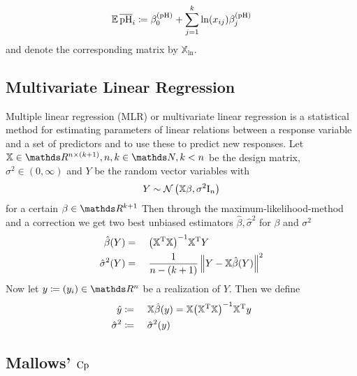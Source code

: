 		\[
			\operatorname{\mathbb{E}} \mathrm{\overline{pH}}_i \coloneqq \beta^{\mathrm{\mathrm{(pH)}}}_0 + \sum_{j = 1}^k{\ln (x_{ij}) \beta^{\mathrm{(pH)}}_j} 
		\]
		and denote the corresponding matrix by $\mathbb{X}_{\ln}$.

	

	\subsection{Multivariate Linear Regression}
	\label{ssec:mlr}
	
		Multiple linear regression (MLR) or multivariate linear regression is a statistical method for estimating parameters of linear relations between a response variable and a set of predictors and to use these to predict new responses.
		Let $\mathbb{X}\in\SR^{n\times(k+1)}, n,k\in\SN,k<n$ be the design matrix, $\sigma^2\in(0,\infty)$ and $Y$ be the random vector variables with
		\[
			Y \sim \mathcal{N}\left( \mathbb{X}\beta,\sigma^2\mathrm{I}_n \right)
		\]
		for a certain $\beta\in\SR^{k+1}$
		Then through the maximum-likelihood-method and a correction we get two best unbiased estimators $\hat{\beta},\hat{\sigma}^2$ for $\beta$ and $\sigma^2$
		\begin{alignat*}{3}
			\hat{\beta}(Y) &=&&\ \inv{\curvb{\transp{\mathbb{X}}\mathbb{X}}}\transp{\mathbb{X}}Y \\
			\hat{\sigma}^2(Y) &=&&\ \frac{1}{n-(k+1)}\norm{Y - \mathbb{X}\hat{\beta}(Y)}^2
		\end{alignat*}
		Now let $y \define (y_i)\in\SR^n$ be a realization of $Y$.
		Then we define
		\begin{alignat*}{3}
			\hat{y} &\coloneqq&&\ \mathbb{X}\hat{\beta}(y) = \mathbb{X}{\left( {\mathbb{X}}^{\mathrm{T}}\mathbb{X} \right)}^{-1}{\mathbb{X}}^{\mathrm{T}}y \\
			\hat{\sigma}^2 &\coloneqq&&\ \hat{\sigma}^2(y)
		\end{alignat*}
	

	\subsection{Mallows' $\mathrm{Cp}$}
	\label{ssec:mallows-cp}
	
